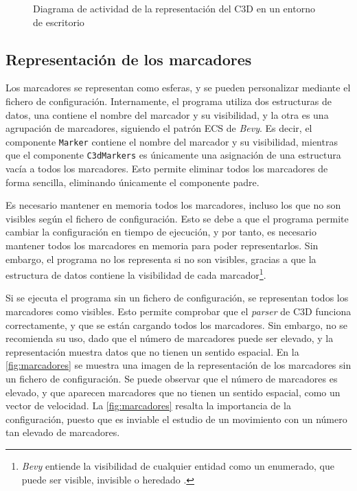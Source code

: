 \begin{figure}[H]
  \caption{Diagrama de actividad de la representación del \ac{C3D} en un entorno de escritorio}
  \label{fig:flujo}
\end{figure}

\subsection{Representación de los marcadores} \label{sec:representacion-marcadores}

Los marcadores se representan como esferas, y se pueden personalizar mediante el fichero de configuración. Internamente, el programa utiliza dos estructuras de datos, una contiene el nombre del marcador y su visibilidad, y la otra es una agrupación de marcadores, siguiendo el patrón \ac{ECS} de \textit{Bevy}. Es decir, el componente \texttt{Marker} contiene el nombre del marcador y su visibilidad, mientras que el componente \texttt{C3dMarkers} es únicamente una asignación de una estructura vacía a todos los marcadores. Esto permite eliminar todos los marcadores de forma sencilla, eliminando únicamente el componente padre.

Es necesario mantener en memoria todos los marcadores, incluso los que no son visibles según el fichero de configuración. Esto se debe a que el programa permite cambiar la configuración en tiempo de ejecución, y por tanto, es necesario mantener todos los marcadores en memoria para poder representarlos. Sin embargo, el programa no los representa si no son visibles, gracias a que la estructura de datos contiene la visibilidad de cada marcador\footnote{\textit{Bevy} entiende la visibilidad de cualquier entidad como un enumerado, que puede ser visible, invisible o heredado \autocite{VisibilityBevyRender}.}.

Si se ejecuta el programa sin un fichero de configuración, se representan todos los marcadores como visibles. Esto permite comprobar que el \textit{parser} de \ac{C3D} funciona correctamente, y que se están cargando todos los marcadores. Sin embargo, no se recomienda su uso, dado que el número de marcadores puede ser elevado, y la representación muestra datos que no tienen un sentido espacial. En la \autoref{fig:marcadores} se muestra una imagen de la representación de los marcadores sin un fichero de configuración. Se puede observar que el número de marcadores es elevado, y que aparecen marcadores que no tienen un sentido espacial, como un vector de velocidad. La \autoref{fig:marcadores} resalta la importancia de la configuración, puesto que es inviable el estudio de un movimiento con un número tan elevado de marcadores. 

